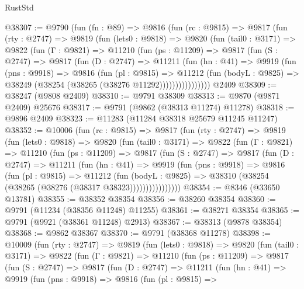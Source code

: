 \begin{lexlean}{RustStd}
\begin{coremodule}
@38307 := @9790
    (fun (fn : @89) =>
    @9816
      (fun (rc : @9815) =>
      @9817
        (fun (rty : @2747) =>
        @9819
          (fun (lets0 : @9818) =>
          @9820
            (fun (tail0 : @3171) =>
            @9822
              (fun (Γ : @9821) =>
              @11210
                (fun (ps : @11209) =>
                @9817
                  (fun (S : @2747) =>
                  @9817
                    (fun (D : @2747) =>
                    @11211
                      (fun (hn : @41) =>
                      @9919
                        (fun (pns : @9918) =>
                        @9816
                          (fun (pl : @9815) =>
                          @11212
                            (fun (bodyL : @9825) =>
                            @38249 (@38254 (@38265 (@38276 @11292))))))))))))))))
    @2409
@38309 := @38247 (@9808 @2409)
@38310 := @9791 @38309
@38313 := @9870 (@9871 @2409) @25676
@38317 := @9791 (@9862 (@38313 @11274) @11278)
@38318 := @9896 @2409
@38323 := @11283 (@11284 @38318 @25679 @11245 @11247)
@38352 := @10006
    (fun (rc : @9815) =>
    @9817
      (fun (rty : @2747) =>
      @9819
        (fun (lets0 : @9818) =>
        @9820
          (fun (tail0 : @3171) =>
          @9822
            (fun (Γ : @9821) =>
            @11210
              (fun (ps : @11209) =>
              @9817
                (fun (S : @2747) =>
                @9817
                  (fun (D : @2747) =>
                  @11211
                    (fun (hn : @41) =>
                    @9919
                      (fun (pns : @9918) =>
                      @9816
                        (fun (pl : @9815) =>
                        @11212
                          (fun (bodyL : @9825) =>
                          @38310 (@38254 (@38265 (@38276 (@38317 @38323))))))))))))))))
@38354 := @8346 (@33650 @13781)
@38355 := @38352 @38354
@38356 := @38260 @38354
@38360 := @9791 (@11234 (@38356 @11248) @11255)
@38361 := @38271 @38354
@38365 := @9791 (@9921 (@38361 @11248) @2913)
@38367 := @38313 (@9878 @38354)
@38368 := @9862 @38367
@38370 := @9791 (@38368 @11278)
@38398 := @10009
    (fun (rty : @2747) =>
    @9819
      (fun (lets0 : @9818) =>
      @9820
        (fun (tail0 : @3171) =>
        @9822
          (fun (Γ : @9821) =>
          @11210
            (fun (ps : @11209) =>
            @9817
              (fun (S : @2747) =>
              @9817
                (fun (D : @2747) =>
                @11211
                  (fun (hn : @41) =>
                  @9919
                    (fun (pns : @9918) =>
                    @9816
                      (fun (pl : @9815) =>

\end{coremodule}
\end{lexlean}
